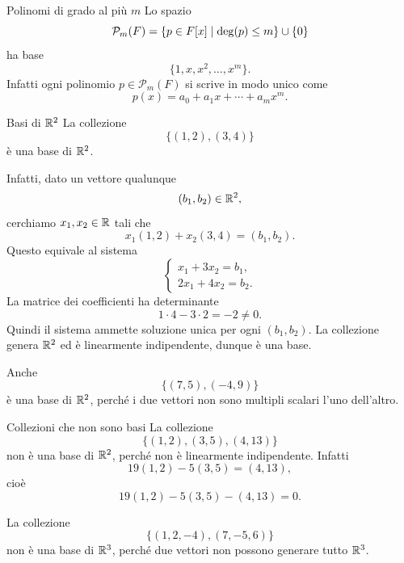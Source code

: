 \documentclass[a4paper]{article}
\begin{document}
\begin{snippetexample}{Polinomi di grado al più \(m\)}
    Lo spazio
    \[
        \mathcal{P}_m(F)=\{p\in F[x]\mid \deg(p)\leq m\}\cup\{0\}
    \]
    ha base
    \[
        \{1,x,x^2,\ldots,x^m\}.
    \]
    Infatti ogni polinomio \(p\in\mathcal{P}_m(F)\) si scrive in modo unico come
    \[
        p(x)=a_0+a_1x+\cdots+a_mx^m.
    \]
\end{snippetexample}

\begin{snippetexample}{Basi di \(\mathbb{R}^2\)}
    La collezione
    \[
        \{(1,2),(3,4)\}
    \]
    è una base di \(\mathbb{R}^2\).

    Infatti, dato un vettore qualunque
    \[
        (b_1,b_2)\in\mathbb{R}^2,
    \]
    cerchiamo \(x_1,x_2\in\mathbb{R}\) tali che
    \[
        x_1(1,2)+x_2(3,4)=(b_1,b_2).
    \]
    Questo equivale al sistema
    \[
        \begin{cases}
            x_1+3x_2=b_1,\\
            2x_1+4x_2=b_2.
        \end{cases}
    \]
    La matrice dei coefficienti ha determinante
    \[
        1\cdot 4-3\cdot 2=-2\neq 0.
    \]
    Quindi il sistema ammette soluzione unica per ogni \((b_1,b_2)\). La collezione genera \(\mathbb{R}^2\) ed è linearmente indipendente, dunque è una base.

    Anche
    \[
        \{(7,5),(-4,9)\}
    \]
    è una base di \(\mathbb{R}^2\), perché i due vettori non sono multipli scalari l'uno dell'altro.
\end{snippetexample}

\begin{snippetexample}{Collezioni che non sono basi}
    La collezione
    \[
        \{(1,2),(3,5),(4,13)\}
    \]
    non è una base di \(\mathbb{R}^2\), perché non è linearmente indipendente. Infatti
    \[
        19(1,2)-5(3,5)=(4,13),
    \]
    cioè
    \[
        19(1,2)-5(3,5)-(4,13)=0.
    \]

    La collezione
    \[
        \{(1,2,-4),(7,-5,6)\}
    \]
    non è una base di \(\mathbb{R}^3\), perché due vettori non possono generare tutto \(\mathbb{R}^3\).
\end{snippetexample}
\end{document}
